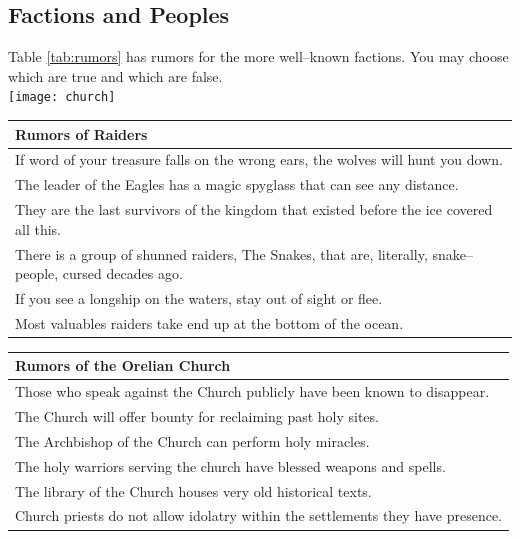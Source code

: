 \documentclass[notitlepage]{article}
\begin{document}
\begin{multicols}{2}
  
  \subsection*{Factions and Peoples}

  Table \ref{tab:rumors} has rumors for the more well--known factions.
  You may choose which are true and which are false. \\

  {\centering \texttt{[image: church]}}

\begin{table}[t]
  \centering
  \begin{tabular}{|p{}|}
    \hline Rumors of Raiders \\ \hline \hline
    If word of your treasure falls on the wrong ears, the wolves will hunt you down. \\ \hline
    The leader of the Eagles has a magic spyglass that can see any distance. \\ \hline
    They are the last survivors of the kingdom that existed before the ice covered all this. \\ \hline
    There is a group of shunned raiders, The Snakes, that are, literally, snake--people, cursed decades ago. \\ \hline
    If you see a longship on the waters, stay out of sight or flee. \\ \hline
    Most valuables raiders take end up at the bottom of the ocean. \\ \hline
  \end{tabular} \begin{tabular}{|p{}|}
                  \hline Rumors of the Orelian Church \\ \hline \hline
                  Those who speak against the Church publicly have been known to disappear. \\ \hline
                  The Church will offer bounty for reclaiming past holy sites. \\ \hline
                  The Archbishop of the Church can perform holy miracles. \\ \hline
                  The holy warriors serving the church have blessed weapons and spells. \\ \hline
                  The library of the Church houses very old historical texts. \\ \hline
                  Church priests do not allow idolatry within the settlements they have presence. \\ \hline

\end{tabular}
\end{table}
\end{multicols}
\end{document}
